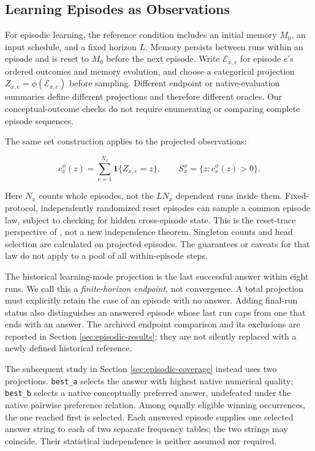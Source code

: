 \documentclass[10pt,letterpaper]{article}
\begin{document}
\subsection{Learning Episodes as Observations}\label{sec:episode-method}

For episodic learning, the reference condition includes an initial memory \(M_0\), an
input schedule, and a fixed horizon \(L\). Memory persists between runs within an episode
and is reset to \(M_0\) before the next episode. Write \(\mathcal E_{x,e}\) for episode
\(e\)'s ordered outcomes and memory evolution, and choose a categorical projection
\(Z_{x,e}=\phi(\mathcal E_{x,e})\) before sampling. Different endpoint or
native-evaluation summaries define different projections and therefore different oracles.
Our conceptual-outcome checks do not require enumerating or comparing complete episode
sequences.

The same set construction applies to the projected observations:

\[
c_x^\phi(z)=\sum_{e=1}^{N_x}\mathbf 1\{Z_{x,e}=z\},\qquad
S_x^\phi=\{z:c_x^\phi(z)>0\}.
\]

Here \(N_x\) counts whole episodes, not the \(L N_x\) dependent runs inside them.
Fixed-protocol, independently randomized reset episodes can sample a common episode law,
subject to checking for hidden cross-episode state. This is the reset-trace perspective of
\citet{ref34}, not a new independence theorem. Singleton counts and head selection are
calculated on projected episodes. The guarantees or caveats for that law do not apply to a
pool of all within-episode steps.

The historical learning-mode projection is the last successful answer within eight runs.
We call this a \emph{finite-horizon endpoint}, not convergence. A total projection must
explicitly retain the case of an episode with no answer. Adding final-run status also
distinguishes an answered episode whose last run caps from one that ends with an answer.
The archived endpoint comparison and its exclusions are reported in Section
\ref{sec:episodic-results}; they are not silently replaced with a newly defined historical
reference.

The subsequent study in Section \ref{sec:episodic-coverage} instead uses two projections.
\texttt{best\_a} selects the answer with highest native numerical quality;
\texttt{best\_b} selects a native conceptually preferred answer, undefeated under the
native pairwise preference relation. Among equally eligible winning occurrences, the one
reached first is selected. Each answered episode supplies one selected answer string to
each of two separate frequency tables; the two strings may coincide. Their statistical
independence is neither assumed nor required.
\end{document}
